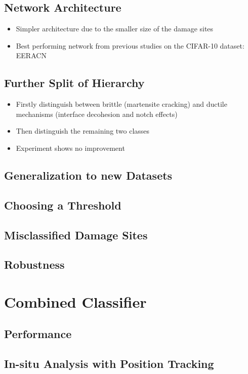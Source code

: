 \documentclass[10pt,a4paper]{report}
\begin{document}
\subsection{Network Architecture}
\begin{itemize}
\item Simpler architecture due to the smaller size of the damage sites
\item Best performing network from previous studies on the CIFAR-10 dataset: EERACN
\end{itemize}
\subsection{Further Split of Hierarchy}
\begin{itemize}
\item Firstly distinguish between brittle (martensite cracking) and ductile mechanisms (interface decohesion and notch effects)
\item Then distinguish the remaining two classes
\item Experiment shows no improvement
\end{itemize}
\subsection{Generalization to new Datasets}
\subsection{Choosing a Threshold}
\subsection{Misclassified Damage Sites}
\subsection{Robustness}

\section{Combined Classifier}
\subsection{Performance}
\subsection{In-situ Analysis with Position Tracking}
\end{document}
